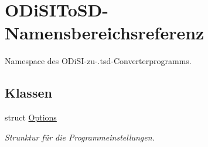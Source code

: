 \hypertarget{namespaceODiSIToSD}{\section{O\-Di\-S\-I\-To\-S\-D-\/\-Namensbereichsreferenz}
\label{namespaceODiSIToSD}
}


Namespace des O\-Di\-S\-I-\/zu-\/.\-tsd-\/\-Converterprogramms.  


\subsection*{Klassen}
\begin{DoxyCompactItemize}
\item 
struct \hyperlink{structODiSIToSD_1_1Options}{Options}
\begin{DoxyCompactList}\small\item\em Strunktur für die Programmeinstellungen. \end{DoxyCompactList}\end{DoxyCompactItemize}
